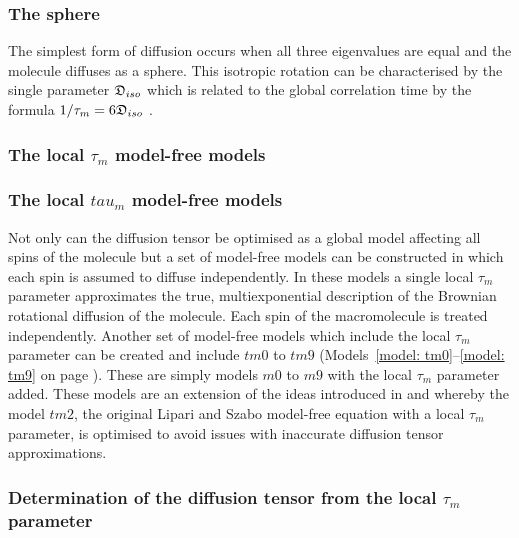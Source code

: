 \begin{htmlonly}
\begin{htmlonly}
\subsubsection{The sphere}

The simplest form of diffusion occurs when all three eigenvalues are equal and the molecule diffuses as a sphere.
This isotropic rotation can be characterised by the single parameter $\mathfrak{D}_{iso}$ which is related to the global correlation time by the formula $1/\tau_m = 6\mathfrak{D}_{iso}$ \citep{Bloembergen48}.


\begin{latexonly}
    \subsubsection{The local $\tau_m$ model-free models}
\end{latexonly}
\begin{htmlonly}
    \subsubsection{The local $tau_m$ model-free models}
\end{htmlonly}

Not only can the diffusion tensor be optimised as a global model affecting all spins of the molecule but a set of model-free models can be constructed in which each spin is assumed to diffuse independently.
In these models a single local $\tau_m$ parameter approximates the true, multiexponential description of the Brownian rotational diffusion of the molecule.
Each spin of the macromolecule is treated independently.
Another set of model-free models which include the local $\tau_m$ parameter can be created and include $tm0$ to $tm9$ (Models~\ref{model: tm0}--\ref{model: tm9} on page \pageref{model: tm0}).
These are simply models $m0$ to $m9$ with the local $\tau_m$ parameter added.
These models are an extension of the ideas introduced in \citet{Barbato92} and \citet{Schurr94} whereby the model $tm2$, the original Lipari and Szabo model-free equation with a local $\tau_m$ parameter, is optimised to avoid issues with inaccurate diffusion tensor approximations.


\begin{latexonly}
    \subsubsection{Determination of the diffusion tensor from the local $\tau_m$ parameter}
\end{latexonly}
\begin{htmlonly}

\end{htmlonly}
\end{htmlonly}
\end{htmlonly}
